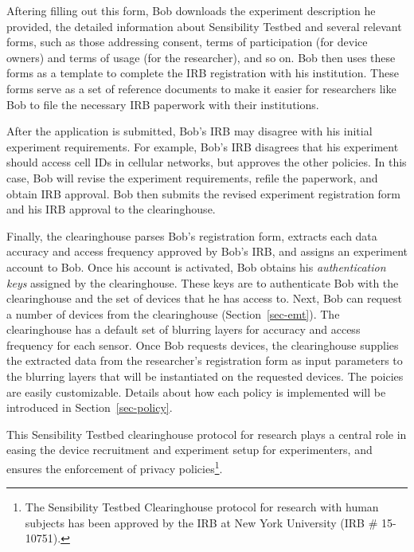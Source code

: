 %
Aftering filling out this form, Bob downloads the experiment description 
he provided, the detailed information about Sensibility Testbed and 
several relevant forms, such as 
those addressing consent, terms of participation (for device owners) 
and terms of usage (for the researcher), and so on.   
Bob then uses these forms as a template to complete the IRB registration 
with his institution. These forms serve as a set of reference documents 
to make it easier for researchers like Bob to 
file the necessary IRB paperwork with their institutions.

After the application is submitted, Bob's IRB may disagree with 
his initial experiment requirements. For example, Bob's IRB disagrees 
that his experiment should access cell IDs in cellular networks, but 
approves the other policies. 
In this case, Bob will revise the experiment requirements, refile the paperwork, 
and obtain IRB approval. Bob then submits the revised experiment 
registration form and his IRB approval to the clearinghouse.

Finally, the clearinghouse
parses Bob's registration form, extracts each data accuracy and access 
frequency approved by Bob's IRB, and assigns an experiment 
account to Bob. Once his account is activated, Bob obtains his 
\textit{authentication keys} assigned by the 
clearinghouse. These keys are to authenticate Bob with the 
clearinghouse and the set of devices that he has access to.
Next, Bob can request a number of devices from the 
clearinghouse (Section~\ref{sec-emt}). The clearinghouse has a default set of blurring layers 
for accuracy and access frequency for each sensor. Once Bob requests 
devices, the clearinghouse supplies the extracted data from the 
researcher's registration form as input parameters to
the blurring layers that will be instantiated on the requested devices. 
The poicies are easily customizable. Details about
how each policy is implemented will be introduced in Section~\ref{sec-policy}.


This Sensibility Testbed
clearinghouse protocol for research plays a central role in
easing the device recruitment and experiment setup for experimenters, 
and ensures the enforcement
of privacy policies\footnote{\scriptsize The Sensibility Testbed Clearinghouse
protocol for research with human subjects has been approved by
the IRB at New York University (IRB \# 15-10751).}. 


